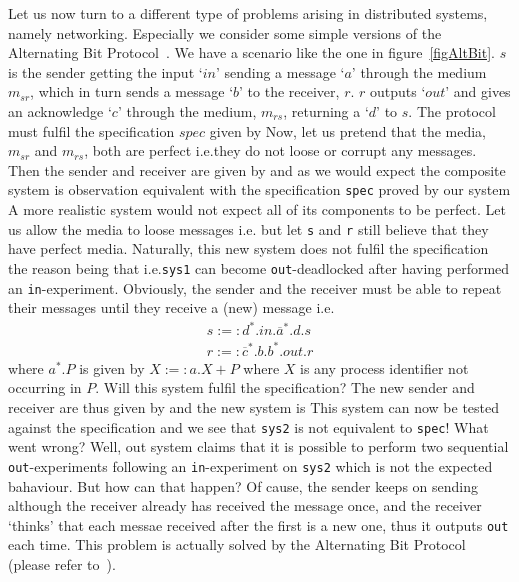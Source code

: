 Let us now turn to a different type of problems arising in distributed systems, namely networking. Especially we consider some simple versions of the Alternating Bit Protocol~\cite{Tanenbaum}. We have a scenario like the one in figure~\ref{figAltBit}. $s$ is the sender getting the input `$in$' sending a message `$a$' through the medium $m_{sr}$, which in turn sends a message `$b$' to the receiver, $r$. $r$ outputs `$out$' and gives an acknowledge `$c$' through the medium, $m_{rs}$, returning a `$d$' to $s$. The protocol must fulfil the specification $spec$ given by
%
Now, let us pretend that the media, $m_{sr}$ and $m_{rs}$, both are perfect i.e.\@ they do not loose or corrupt any messages.
%
Then the sender and receiver are given by
%
and as we would expect the composite system
%
is observation equivalent with the specification \verb!spec! proved by our system
%
A more realistic system would not expect all of its components to be perfect. Let us allow the media to loose messages i.e.\@
{}%
but let \verb!s! and \verb!r! still believe that they have perfect media. Naturally, this new system
%
does not fulfil the specification the reason being that
%
i.e.\@ \verb!sys1! can become \verb!out!-deadlocked after having performed an \verb!in!-experiment. Obviously, the sender and the receiver must be able to repeat their messages until they receive a (new) message i.e.\@
\[\begin{array}{l}
s :=: d^{*}.in.\overline{a}^{*}.d.s\\
r :=: \overline{c}^{*}.b.b^{*}.out.r
\end{array}
\]
where $a^{*}.P$ is given by $X:=: a.X + P$ where $X$ is any process identifier not occurring in $P$. Will this system fulfil the specification? The new sender and receiver are thus given by
%
and the new system is
%
This system can now be tested against the specification
%
and we see that \verb#sys2# is not equivalent to \verb#spec#! What went wrong? Well, out system claims that it is possible to perform two sequential \verb#out#-experiments following an \verb#in#-experiment on \verb#sys2# which is not the expected bahaviour. But how can that happen? Of cause, the sender keeps on sending although the receiver already has received the message once, and the receiver `thinks' that each messae received after the first is a new one, thus it outputs \verb#out# each time. This problem is actually solved by the Alternating Bit Protocol (please refer to~\cite{Tanenbaum}).

